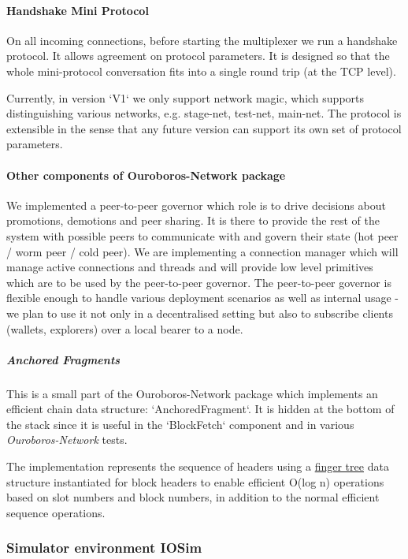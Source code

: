 \documentclass[11pt,a4paper]{article}
\begin{document}
\paragraph{Handshake Mini Protocol}

On all incoming connections, before starting the multiplexer we run a
handshake protocol. It allows agreement on protocol parameters. It is
designed so that the whole mini-protocol conversation fits into a single
round trip (at the TCP level).

Currently, in version `V1` we only support network magic, which supports
distinguishing various networks, e.g. stage-net, test-net, main-net. The
protocol is extensible in the sense that any future version can support
its own set of protocol parameters.

\paragraph{Other components of Ouroboros-Network package}

We implemented a peer-to-peer governor which role is to drive decisions
about promotions, demotions and peer sharing. It is there to provide the rest
of the system with possible peers to communicate with and govern their
state (hot peer / worm peer / cold peer). We are implementing a
connection manager which will manage active connections and threads and
will provide low level primitives which are to be used by the
peer-to-peer governor. The peer-to-peer governor is flexible enough to
handle various deployment scenarios as well as internal usage - we plan
to use it not only in a decentralised setting but also to subscribe
clients (wallets, explorers) over a local bearer to a node.

\subparagraph{Anchored Fragments}
\label{anchored-fragments}

This is a small part of the Ouroboros-Network package which implements
an efficient chain data structure: `AnchoredFragment`.
It is hidden at the bottom of the stack since it is useful in the
`BlockFetch` component and in various \emph{Ouroboros-Network} tests.

The implementation represents the sequence of headers using a
\href{http://www.staff.city.ac.uk/~ross/papers/FingerTree.html}{finger
tree} data structure instantiated for block headers to enable efficient
O(log n) operations based on slot numbers and block numbers, in addition
to the normal efficient sequence operations.

\subsubsection{Simulator environment IOSim}
\label{simulator-environment-simm}
\end{document}
